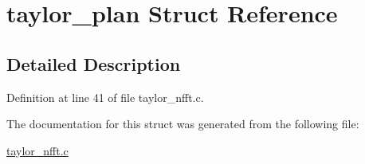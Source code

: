 \hypertarget{structtaylor__plan}{\section{taylor\-\_\-plan Struct Reference}
\label{structtaylor__plan}
}


\subsection{Detailed Description}


Definition at line 41 of file taylor\-\_\-nfft.\-c.



The documentation for this struct was generated from the following file\-:\begin{DoxyCompactItemize}
\item 
\hyperlink{taylor__nfft_8c}{taylor\-\_\-nfft.\-c}\end{DoxyCompactItemize}
